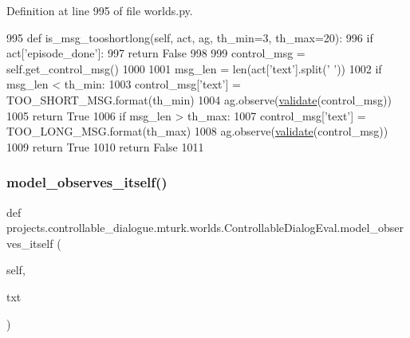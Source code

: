 Definition at line 995 of file worlds.\+py.


\begin{DoxyCode}
995     \textcolor{keyword}{def }is\_msg\_tooshortlong(self, act, ag, th\_min=3, th\_max=20):
996         \textcolor{keywordflow}{if} act[\textcolor{stringliteral}{'episode\_done'}]:
997             \textcolor{keywordflow}{return} \textcolor{keyword}{False}
998 
999         control\_msg = self.get\_control\_msg()
1000 
1001         msg\_len = len(act[\textcolor{stringliteral}{'text'}].split(\textcolor{stringliteral}{' '}))
1002         \textcolor{keywordflow}{if} msg\_len < th\_min:
1003             control\_msg[\textcolor{stringliteral}{'text'}] = TOO\_SHORT\_MSG.format(th\_min)
1004             ag.observe(\hyperlink{namespaceparlai_1_1core_1_1worlds_afc3fad603b7bce41dbdc9cdc04a9c794}{validate}(control\_msg))
1005             \textcolor{keywordflow}{return} \textcolor{keyword}{True}
1006         \textcolor{keywordflow}{if} msg\_len > th\_max:
1007             control\_msg[\textcolor{stringliteral}{'text'}] = TOO\_LONG\_MSG.format(th\_max)
1008             ag.observe(\hyperlink{namespaceparlai_1_1core_1_1worlds_afc3fad603b7bce41dbdc9cdc04a9c794}{validate}(control\_msg))
1009             \textcolor{keywordflow}{return} \textcolor{keyword}{True}
1010         \textcolor{keywordflow}{return} \textcolor{keyword}{False}
1011 
\end{DoxyCode}
\mbox{\label{classprojects_1_1controllable__dialogue_1_1mturk_1_1worlds_1_1ControllableDialogEval_a196c0350ae2204d7949f8ae177bd07bc}} 
\subsubsection{\texorpdfstring{model\+\_\+observes\+\_\+itself()}{model\_observes\_itself()}}
{\footnotesize\ttfamily def projects.\+controllable\+\_\+dialogue.\+mturk.\+worlds.\+Controllable\+Dialog\+Eval.\+model\+\_\+observes\+\_\+itself (\begin{DoxyParamCaption}\item[{}]{self,  }\item[{}]{txt }\end{DoxyParamCaption})}



